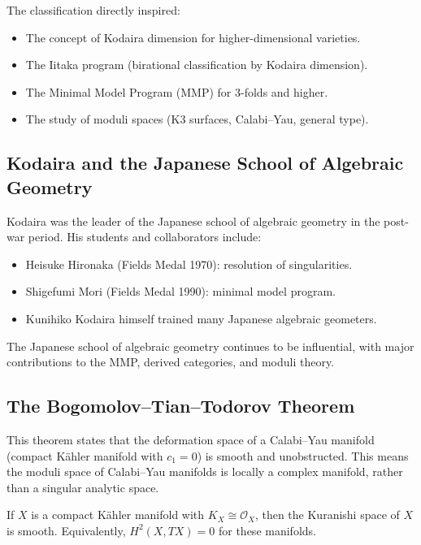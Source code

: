 The classification directly inspired:
\begin{itemize}
    \item The concept of Kodaira dimension for higher-dimensional varieties.
    \item The Iitaka program (birational classification by Kodaira dimension).
    \item The Minimal Model Program (MMP) for 3-folds and higher.
    \item The study of moduli spaces (K3 surfaces, Calabi--Yau, general type).
\end{itemize}

\subsection{Kodaira and the Japanese School of Algebraic Geometry}

Kodaira was the leader of the Japanese school of algebraic geometry in the post-war period. His students and collaborators include:
\begin{itemize}
    \item Heisuke Hironaka (Fields Medal 1970): resolution of singularities.
    \item Shigefumi Mori (Fields Medal 1990): minimal model program.
    \item Kunihiko Kodaira himself trained many Japanese algebraic geometers.
\end{itemize}

The Japanese school of algebraic geometry continues to be influential, with major contributions to the MMP, derived categories, and moduli theory.

\subsection{The Bogomolov--Tian--Todorov Theorem}

This theorem states that the deformation space of a Calabi--Yau manifold (compact K\"{a}hler manifold with $c_1 = 0$) is smooth and unobstructed. This means the moduli space of Calabi--Yau manifolds is locally a complex manifold, rather than a singular analytic space.

\begin{theorem}[BTT]
If $X$ is a compact K\"{a}hler manifold with $K_X \cong \mathcal{O}_X$, then the Kuranishi space of $X$ is smooth. Equivalently, $H^2(X, TX) = 0$ for these manifolds.
\end{theorem}

